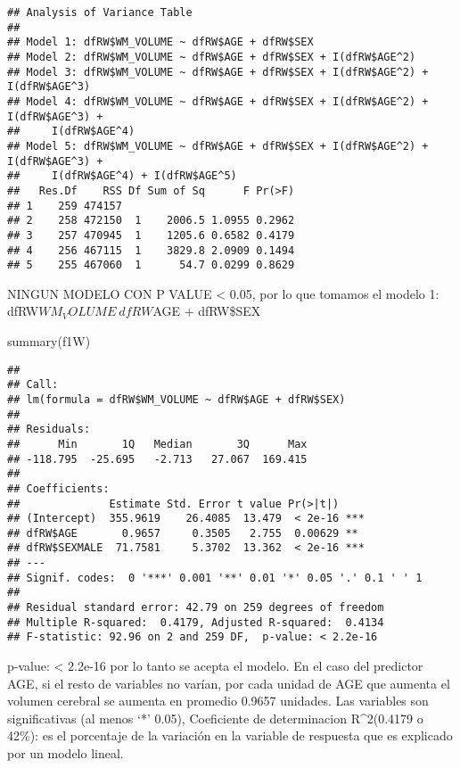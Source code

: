 \documentclass[
]{article}
\newenvironment{Shaded}{\begin{snugshade}}{\end{snugshade}}
\newcommand{\FunctionTok}[1]{\textcolor[rgb]{0.00,0.00,0.00}{#1}}
\newcommand{\NormalTok}[1]{#1}
\begin{document}
\begin{verbatim}
## Analysis of Variance Table
## 
## Model 1: dfRW$WM_VOLUME ~ dfRW$AGE + dfRW$SEX
## Model 2: dfRW$WM_VOLUME ~ dfRW$AGE + dfRW$SEX + I(dfRW$AGE^2)
## Model 3: dfRW$WM_VOLUME ~ dfRW$AGE + dfRW$SEX + I(dfRW$AGE^2) + I(dfRW$AGE^3)
## Model 4: dfRW$WM_VOLUME ~ dfRW$AGE + dfRW$SEX + I(dfRW$AGE^2) + I(dfRW$AGE^3) + 
##     I(dfRW$AGE^4)
## Model 5: dfRW$WM_VOLUME ~ dfRW$AGE + dfRW$SEX + I(dfRW$AGE^2) + I(dfRW$AGE^3) + 
##     I(dfRW$AGE^4) + I(dfRW$AGE^5)
##   Res.Df    RSS Df Sum of Sq      F Pr(>F)
## 1    259 474157                           
## 2    258 472150  1    2006.5 1.0955 0.2962
## 3    257 470945  1    1205.6 0.6582 0.4179
## 4    256 467115  1    3829.8 2.0909 0.1494
## 5    255 467060  1      54.7 0.0299 0.8629
\end{verbatim}

NINGUN MODELO CON P VALUE \textless{} 0.05, por lo que tomamos el modelo
1: dfRW\(WM_VOLUME ~ dfRW\)AGE + dfRW\$SEX

\begin{Shaded}
\begin{Highlighting}[]
\FunctionTok{summary}\NormalTok{(f1W) }
\end{Highlighting}
\end{Shaded}

\begin{verbatim}
## 
## Call:
## lm(formula = dfRW$WM_VOLUME ~ dfRW$AGE + dfRW$SEX)
## 
## Residuals:
##      Min       1Q   Median       3Q      Max 
## -118.795  -25.695   -2.713   27.067  169.415 
## 
## Coefficients:
##              Estimate Std. Error t value Pr(>|t|)    
## (Intercept)  355.9619    26.4085  13.479  < 2e-16 ***
## dfRW$AGE       0.9657     0.3505   2.755  0.00629 ** 
## dfRW$SEXMALE  71.7581     5.3702  13.362  < 2e-16 ***
## ---
## Signif. codes:  0 '***' 0.001 '**' 0.01 '*' 0.05 '.' 0.1 ' ' 1
## 
## Residual standard error: 42.79 on 259 degrees of freedom
## Multiple R-squared:  0.4179, Adjusted R-squared:  0.4134 
## F-statistic: 92.96 on 2 and 259 DF,  p-value: < 2.2e-16
\end{verbatim}

p-value: \textless{} 2.2e-16 por lo tanto se acepta el modelo. En el
caso del predictor AGE, si el resto de variables no varían, por cada
unidad de AGE que aumenta el volumen cerebral se aumenta en promedio
0.9657 unidades. Las variables son significativas (al menos `*' 0.05),
Coeficiente de determinacion R\^{}2(0.4179 o 42\%): es el porcentaje de
la variación en la variable de respuesta que es explicado por un modelo
lineal.
\end{document}
